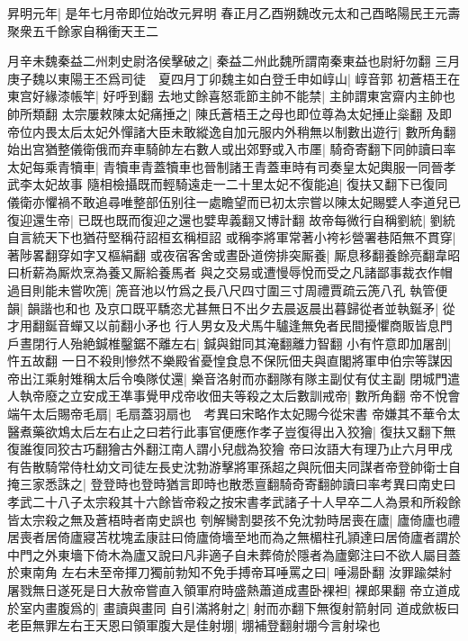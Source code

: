 昇明元年|{
	是年七月帝即位始改元昇明}
春正月乙酉朔魏改元太和己酉略陽民王元壽聚衆五千餘家自稱衝天王二

月辛未魏秦益二州刺史尉洛侯擊破之|{
	秦益二州此魏所謂南秦東益也尉紆勿翻}
三月庚子魏以東陽王丕爲司徒　夏四月丁卯魏主如白登壬申如崞山|{
	崞音郭}
初蒼梧王在東宫好緣漆帳竿|{
	好呼到翻}
去地丈餘喜怒乖節主帥不能禁|{
	主帥謂東宮齋内主帥也帥所類翻}
太宗屢敕陳太妃痛捶之|{
	陳氏蒼梧王之母也即位尊為太妃捶止橤翻}
及即帝位内畏太后太妃外憚諸大臣未敢縱逸自加元服内外稍無以制數出遊行|{
	數所角翻}
始出宫猶整儀衛俄而弃車騎帥左右數人或出郊野或入市㕓|{
	騎奇寄翻下同帥讀曰率}
太妃每乘青犢車|{
	青犢車青蓋犢車也晉制諸王青蓋車時有司奏皇太妃輿服一同晉孝武李太妃故事}
隨相檢攝既而輕騎遠走一二十里太妃不復能追|{
	復扶又翻下已復同}
儀衛亦懼禍不敢追尋唯整部伍别往一處瞻望而已初太宗嘗以陳太妃賜嬖人李道兒已復迎還生帝|{
	已既也既而復迎之還也嬖卑義翻又博計翻}
故帝每微行自稱劉統|{
	劉統自言統天下也猶苻堅稱苻詔桓玄稱桓詔}
或稱李將軍常著小袴衫營署巷陌無不貫穿|{
	著陟畧翻穿如字又樞絹翻}
或夜宿客舍或晝卧道傍排突厮養|{
	厮息移翻養餘亮翻韋昭曰析薪為厮炊烹為養又厮給養馬者}
與之交易或遭慢辱悅而受之凡諸鄙事裁衣作帽過目則能未嘗吹箎|{
	箎音池以竹爲之長八尺四寸圍三寸周禮賈疏云箎八孔}
執管便韻|{
	韻諧也和也}
及京口既平驕恣尤甚無日不出夕去晨返晨出暮歸從者並執鋋矛|{
	從才用翻鋋音蟬又以前翻小矛也}
行人男女及犬馬牛驢逢無免者民間擾懼商販皆息門戶晝閉行人殆絶鍼椎鑿鋸不離左右|{
	鍼與鉗同其淹翻離力智翻}
小有忤意即加屠剖|{
	忤五故翻}
一日不殺則慘然不樂殿省憂惶食息不保阮佃夫與直閣將軍申伯宗等謀因帝出江乘射雉稱太后令喚隊仗還|{
	樂音洛射而亦翻隊有隊主副仗有仗主副}
閉城門遣人執帝廢之立安成王凖事覺甲戍帝收佃夫等殺之太后數訓戒帝|{
	數所角翻}
帝不悅會端午太后賜帝毛扇|{
	毛扇蓋羽扇也　考異曰宋略作太妃賜今從宋書}
帝嫌其不華令太醫煮藥欲鴆太后左右止之曰若行此事官便應作孝子豈復得出入狡獪|{
	復扶又翻下無復誰復同狡古巧翻獪古外翻江南人謂小兒戲為狡獪}
帝曰汝語大有理乃止六月甲戌有告散騎常侍杜幼文司徒左長史沈勃游擊將軍孫超之與阮佃夫同謀者帝登帥衛士自掩三家悉誅之|{
	登登時也登時猶言即時也散悉亶翻騎奇寄翻帥讀曰率考異曰南史曰孝武二十八子太宗殺其十六餘皆帝殺之按宋書孝武諸子十人早卒二人為景和所殺餘皆太宗殺之無及蒼梧時者南史誤也}
刳解臠割嬰孩不免沈勃時居喪在廬|{
	廬倚廬也禮居喪者居倚廬寢苫枕塊孟康註曰倚廬倚墻至地而為之無楣柱孔頴達曰居倚廬者謂於中門之外東墻下倚木為廬又說曰凡非適子自未葬倚於隱者為廬鄭注曰不欲人屬目蓋於東南角}
左右未至帝揮刀獨前勃知不免手搏帝耳唾罵之曰|{
	唾湯卧翻}
汝罪踰桀紂屠戮無日遂死是日大赦帝嘗直入領軍府時盛熱蕭道成晝卧裸袒|{
	裸郎果翻}
帝立道成於室内畫腹爲的|{
	畫讀與畫同}
自引滿將射之|{
	射而亦翻下無復射箭射同}
道成歛板曰老臣無罪左右王天恩曰領軍腹大是佳射堋|{
	堋補登翻射堋今言射垜也}
